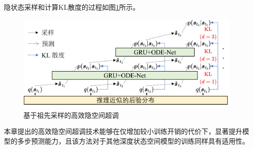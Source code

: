 隐状态采样和计算KL散度的过程如图\ref{fig:overshooting}所示。
\begin{figure}[ht]
    \centering
    \includegraphics[width=0.9\linewidth]{figures/chapter5/overshooting.pdf}
    \caption{基于祖先采样的高效隐空间超调}
    \label{fig:overshooting}
\end{figure}

本章提出的高效隐空间超调技术能够在仅增加较小训练开销的代价下，显著提升模型的多步预测能力，且该方法对于其他深度状态空间模型的训练同样具有适用性。


